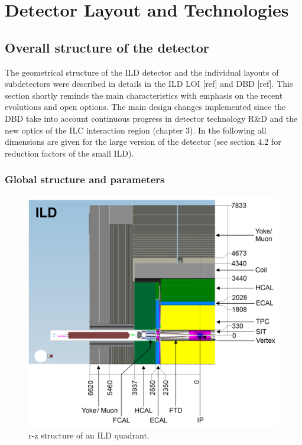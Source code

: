 
\chapter{Detector Layout and Technologies}




\section{Overall structure of the detector}

The geometrical structure of the ILD detector and the individual layouts of subdetectors were described in details in the ILD LOI [ref] and DBD [ref]. This section shortly reminds the main characteristics with emphasis on the recent evolutions and open options. The main design changes implemented since the DBD take into account continuous progress in detector technology R\&D and the new optics of the ILC interaction region (chapter 3). In the following all dimensions are given for the large version of the detector (see section 4.2 for reduction factors of the small ILD).

\vspace{2cm}

\subsection{Global structure and parameters}


\begin{figure}[t!]
\centering
\includegraphics[width=0.6\hsize]{Detector/fig/ILD_quadrant_2.png}
\caption{r-z structure of an ILD quadrant.}
\label{fig:det:quad}
\end{figure}

